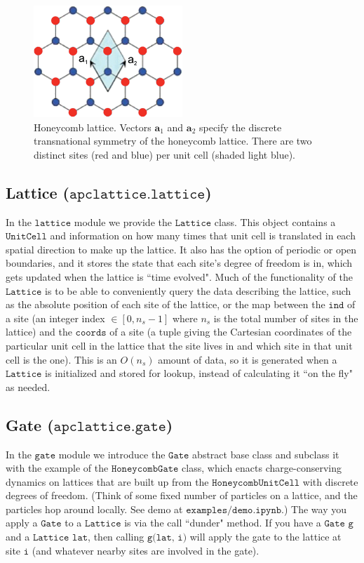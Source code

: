 \documentclass{article}
\begin{document}
\begin{figure}[ht]
    \centering
    \includegraphics[width=0.5\textwidth]{honeycomb.png}
    \caption{Honeycomb lattice. Vectors $\mathbf{a}_1$ and $\mathbf{a}_2$ specify the discrete transnational symmetry of the honeycomb lattice. There are two distinct sites (red and blue) per unit cell (shaded light blue).}
    \label{fig:honeycomb}
\end{figure}

\subsection{Lattice ($\texttt{apclattice.lattice}$)}
In the $\texttt{lattice}$ module we provide the $\texttt{Lattice}$ class. This object contains a $\texttt{UnitCell}$ and information on how many times that unit cell is translated in each spatial direction to make up the lattice. It also has the option of periodic or open boundaries, and it stores the state that each site's degree of freedom is in, which gets updated when the lattice is ``time evolved". Much of the functionality of the $\texttt{Lattice}$ is to be able to conveniently query the data describing the lattice, such as the absolute position of each site of the lattice, or the map between the $\texttt{ind}$ of a site (an integer index $\in [0, n_s-1]$ where $n_s$ is the total number of sites in the lattice) and the $\texttt{coords}$ of a site (a tuple giving the Cartesian coordinates of the particular unit cell in the lattice that the site lives in and which site in that unit cell is the one). This is an $O(n_s)$ amount of data, so it is generated when a $\texttt{Lattice}$ is initialized and stored for lookup, instead of calculating it ``on the fly" as needed.

\subsection{Gate ($\texttt{apclattice.gate}$)}
In the $\texttt{gate}$ module we introduce the $\texttt{Gate}$ abstract base class and subclass it with the example of the $\texttt{HoneycombGate}$ class, which enacts charge-conserving dynamics on lattices that are built up from the $\texttt{HoneycombUnitCell}$ with discrete degrees of freedom. (Think of some fixed number of particles on a lattice, and the particles hop around locally. See demo at $\texttt{examples/demo.ipynb}$.) The way you apply a $\texttt{Gate}$ to a $\texttt{Lattice}$ is via the call ``dunder" method. If you have a $\texttt{Gate}$ $\texttt{g}$ and a $\texttt{Lattice}$ $\texttt{lat}$, then calling $\texttt{g(lat, i)}$ will apply the gate to the lattice at site $\texttt{i}$ (and whatever nearby sites are involved in the gate).
\end{document}
